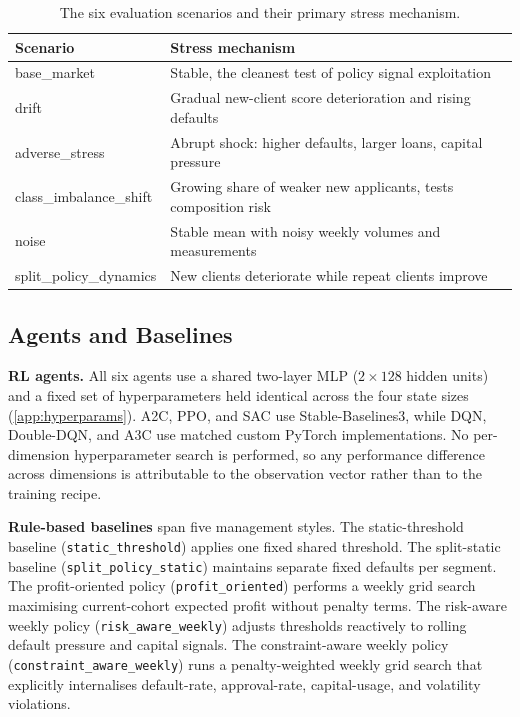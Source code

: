 \documentclass[preprint,review,authoryear,12pt]{elsarticle}
\begin{document}
\begin{table}[t]
    \centering
    \small
    \caption{The six evaluation scenarios and their primary stress mechanism.}
    \label{tab:scenarios}
    \begin{tabularx}{0.96\linewidth}{>{\ttfamily}p{}X}
        \toprule
        Scenario                & Stress mechanism                                               \\
        \midrule
        base\_market            & Stable, the cleanest test of policy signal exploitation        \\
        drift                   & Gradual new-client score deterioration and rising defaults     \\
        adverse\_stress         & Abrupt shock: higher defaults, larger loans, capital pressure  \\
        class\_imbalance\_shift & Growing share of weaker new applicants, tests composition risk \\
        noise                   & Stable mean with noisy weekly volumes and measurements         \\
        split\_policy\_dynamics & New clients deteriorate while repeat clients improve           \\
        \bottomrule
    \end{tabularx}
\end{table}

\subsection{Agents and Baselines}

\textbf{RL agents.}\;
All six agents use a shared two-layer MLP ($2 \times 128$ hidden units) and a fixed set
of hyperparameters held identical across the four state sizes (\ref{app:hyperparams}).
A2C, PPO, and SAC use Stable-Baselines3, while DQN, Double-DQN, and A3C use matched
custom PyTorch implementations. No per-dimension hyperparameter search is performed, so
any performance difference across dimensions is attributable to the observation vector
rather than to the training recipe.

\textbf{Rule-based baselines} span five management styles. The static-threshold
baseline (\texttt{static\_threshold}) applies one fixed shared threshold. The
split-static baseline (\texttt{split\_policy\_static}) maintains separate fixed defaults
per segment. The profit-oriented policy (\texttt{profit\_oriented}) performs a weekly
grid search maximising current-cohort expected profit without penalty terms. The
risk-aware weekly policy (\texttt{risk\_aware\_weekly}) adjusts thresholds reactively to
rolling default pressure and capital signals. The constraint-aware weekly policy
(\texttt{constraint\_aware\_weekly}) runs a penalty-weighted weekly grid search that
explicitly internalises default-rate, approval-rate, capital-usage, and volatility
violations.
\end{document}
